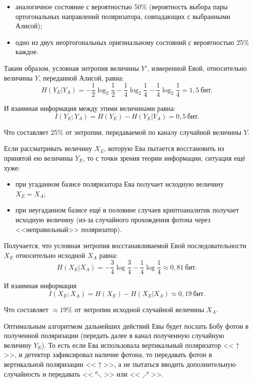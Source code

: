 \begin{itemize}
	\item аналогичное состояние с вероятностью 50\% (вероятность выбора пары ортогональных направлений поляризатора, совпадающих с выбранными Алисой);
	\item одно из двух неортогональных оригинальному состояний с вероятностью 25\% каждое.
\end{itemize}

Таким образом, условная энтропия величины $Y'$, измеренной Евой, относительно величины $Y$, переданной Алисой, равна:
\[ H \left( Y_E | Y_A \right) = - \frac{1}{2} \log_2 \frac{1}{2} - \frac{1}{4} \log_2 \frac{1}{4} - \frac{1}{4} \log_2 \frac{1}{4} = 1,5~\text{бит}. \]

И взаимная информация между этими величинами равна:
\[ I \left( Y_E ; Y_A \right) = H \left( Y_E \right) - H ( Y_E | Y_A ) = 0,5~\text{бит}.\]

Что составляет 25\% от энтропии, передаваемой по каналу случайной величины $Y$.

Если рассматривать величину $X_E$, которую Ева пытается восстановить из принятой ею величины $Y_E$, то с точки зрения теории информации, ситуация ещё хуже:

\begin{itemize}
	\item при угаданном базисе поляризатора Ева получает исходную величину $X_E = X_A$;
	\item при неугаданном базисе ещё в половине случаев криптоаналитик получает исходную величину (из-за случайного прохождения фотона через <<неправильный>> поляризатор).
\end{itemize}

Получается, что условная энтропия восстанавливаемой Евой последовательности $X_E$ относительно исходной $X_A$ равна:
\[ H \left( X_E | X_A \right) = - \frac{3}{4} \log \frac{3}{4} - \frac{1}{4} \log \frac{1}{4} \approx 0,81~\text{бит.}\]

И взаимная информация
\[ I \left( X_E; X_A \right) = H \left( X_E \right) - H \left( X_E | X_A \right) \approx 0,19~\text{бит}. \]

Что составляет $\approx 19\%$ от энтропии исходной случайной величины $X_A$.

Оптимальным алгоритмом дальнейших действий Евы будет послать Бобу фотон в полученной поляризации (передать далее в канал полученную случайную величину $Y_E$). То есть если Ева использовала вертикальный поляризатор <<$\uparrow$>>, и детектор зафиксировал наличие фотона, то передавать фотон в вертикальной поляризации <<$\uparrow$>>, а не пытаться вводить дополнительную случайность и передавать <<$\nwarrow$>> или <<$\nearrow$>>.

